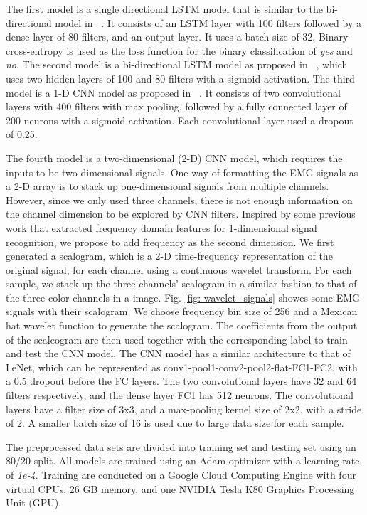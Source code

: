 \documentclass{article}
\begin{document}
The first model is a single directional LSTM model that is similar to the bi-directional model in ~\cite{janke_emg--speech:_2017}. It consists of an LSTM layer with 100 filters followed by a dense layer of 80 filters, and an output layer. It uses a batch size of 32.  Binary cross-entropy is used as the loss function for the binary classification of \textit{yes} and \textit{no}. %
The second model is a bi-directional LSTM model as proposed in ~\cite{janke_emg--speech:_2017}, which uses two hidden layers of 100 and 80 filters with a sigmoid activation.
The third model is a 1-D CNN model as proposed in  ~\cite{kapur_alterego:_2018}. It consists of two convolutional layers with 400 filters with max pooling,  followed by a fully connected layer of 200 neurons with a sigmoid activation. Each convolutional layer used a dropout of 0.25. 

The fourth model is a two-dimensional (2-D) CNN model, which requires the inputs to be two-dimensional signals. One way of formatting the EMG signals as a 2-D array is to stack up one-dimensional signals from multiple channels. However, since we only used three channels, there is not enough information on the channel dimension to be explored by CNN filters. Inspired by some previous work that extracted frequency domain features for 1-dimensional signal recognition, we propose to add frequency as the second dimension.  We first generated a scalogram, which is a 2-D time-frequency representation of the original signal, for each channel using a continuous wavelet transform. For each sample, we stack up the three channels' scalogram in a similar fashion to that of the three color channels in a image.  Fig. \ref{fig: wavelet_signals} showes some EMG signals with their scalogram.  We choose frequency bin size of 256 and a Mexican hat wavelet function to generate the scalogram. The coefficients from the output of the scaleogram are then used together with the corresponding label to train and test the CNN model. The CNN model has a similar architecture to that of LeNet, which can be represented as conv1-pool1-conv2-pool2-flat-FC1-FC2, with a  0.5 dropout before the FC layers. The two convolutional layers have 32 and 64 filters respectively, and the dense layer FC1 has 512 neurons. The convolutional layers have a filter size of 3x3, and a max-pooling kernel size of 2x2, with a stride of 2. A smaller batch size of 16 is used due to large data size for each sample. 

The preprocessed data sets are divided into training set and testing set using an 80/20 split. All models are trained using an Adam optimizer with a learning rate of \textit{1e-4}. Training are conducted on a Google Cloud Computing Engine with four virtual CPUs, 26 GB memory, and one NVIDIA Tesla K80 Graphics Processing Unit (GPU).
\end{document}
